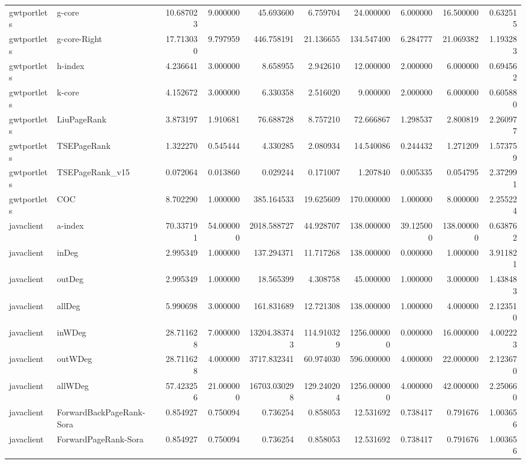 \begin{tabular}{llrrrrrrrr}
gwtportlets & g-core & 10.687023 & 9.000000 & 45.693600 & 6.759704 & 24.000000 & 6.000000 & 16.500000 & 0.632515 \\
gwtportlets & g-core-Right & 17.713030 & 9.797959 & 446.758191 & 21.136655 & 134.547400 & 6.284777 & 21.069382 & 1.193283 \\
gwtportlets & h-index & 4.236641 & 3.000000 & 8.658955 & 2.942610 & 12.000000 & 2.000000 & 6.000000 & 0.694562 \\
gwtportlets & k-core & 4.152672 & 3.000000 & 6.330358 & 2.516020 & 9.000000 & 2.000000 & 6.000000 & 0.605880 \\
gwtportlets & LiuPageRank & 3.873197 & 1.910681 & 76.688728 & 8.757210 & 72.666867 & 1.298537 & 2.800819 & 2.260977 \\
gwtportlets & TSEPageRank & 1.322270 & 0.545444 & 4.330285 & 2.080934 & 14.540086 & 0.244432 & 1.271209 & 1.573759 \\
gwtportlets & TSEPageRank_v15 & 0.072064 & 0.013860 & 0.029244 & 0.171007 & 1.207840 & 0.005335 & 0.054795 & 2.372991 \\
gwtportlets & COC & 8.702290 & 1.000000 & 385.164533 & 19.625609 & 170.000000 & 1.000000 & 8.000000 & 2.255224 \\
javaclient & a-index & 70.337191 & 54.000000 & 2018.588727 & 44.928707 & 138.000000 & 39.125000 & 138.000000 & 0.638762 \\
javaclient & inDeg & 2.995349 & 1.000000 & 137.294371 & 11.717268 & 138.000000 & 0.000000 & 1.000000 & 3.911821 \\
javaclient & outDeg & 2.995349 & 1.000000 & 18.565399 & 4.308758 & 45.000000 & 1.000000 & 3.000000 & 1.438483 \\
javaclient & allDeg & 5.990698 & 3.000000 & 161.831689 & 12.721308 & 138.000000 & 1.000000 & 4.000000 & 2.123510 \\
javaclient & inWDeg & 28.711628 & 7.000000 & 13204.383743 & 114.910329 & 1256.000000 & 0.000000 & 16.000000 & 4.002223 \\
javaclient & outWDeg & 28.711628 & 4.000000 & 3717.832341 & 60.974030 & 596.000000 & 4.000000 & 22.000000 & 2.123670 \\
javaclient & allWDeg & 57.423256 & 21.000000 & 16703.030298 & 129.240204 & 1256.000000 & 4.000000 & 42.000000 & 2.250660 \\
javaclient & ForwardBackPageRank-Sora & 0.854927 & 0.750094 & 0.736254 & 0.858053 & 12.531692 & 0.738417 & 0.791676 & 1.003656 \\
javaclient & ForwardPageRank-Sora & 0.854927 & 0.750094 & 0.736254 & 0.858053 & 12.531692 & 0.738417 & 0.791676 & 1.003656 \\

\end{tabular}
